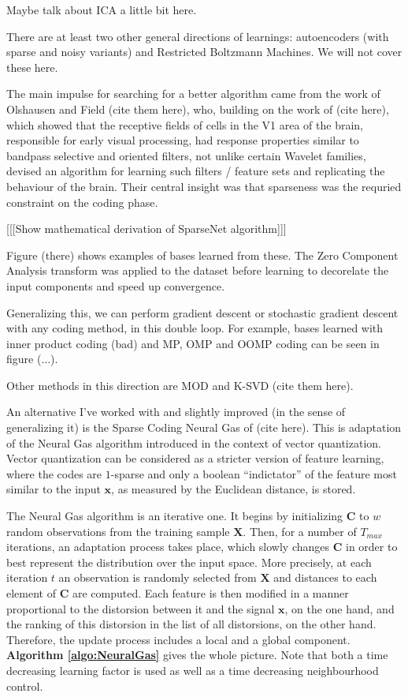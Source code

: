 \documentclass[12pt,a4paper,oneside,english]{UPBThesis}
\begin{document}
Maybe talk about ICA a little bit here.

There are at least two other general directions of learnings: autoencoders (with sparse and noisy variants) and Restricted Boltzmann Machines. We will not cover these here.

The main impulse for searching for a better algorithm came from the work of Olshausen and Field (cite them here), who, building on the work of (cite here), which showed that the receptive fields of cells in the V1 area of the brain, responsible for early visual processing, had response properties similar to bandpass selective and oriented filters, not unlike certain Wavelet families, devised an algorithm for learning such filters / feature sets and replicating the behaviour of the brain. Their central insight was that sparseness was the requried constraint on the coding phase.

[[[Show mathematical derivation of SparseNet algorithm]]]

Figure (there) shows examples of bases learned from these. The Zero Component Analysis transform was applied to the dataset before learning to decorelate the input components and speed up convergence.

Generalizing this, we can perform gradient descent or stochastic gradient descent with any coding method, in this double loop. For example, bases learned with inner product coding (bad) and MP, OMP and OOMP coding can be seen in figure (...).

Other methods in this direction are MOD and K-SVD (cite them here).

An alternative I've worked with and slightly improved (in the sense of generalizing it) is the Sparse Coding Neural Gas of (cite here). This is adaptation of the Neural Gas algorithm introduced in the context of vector quantization. Vector quantization can be considered as a stricter version of feature learning, where the codes are $1$-sparse and only a boolean ``indictator'' of the feature most similar to the input $\textbf{x}$, as measured by the Euclidean distance, is stored.

The Neural Gas algorithm is an iterative one. It begins by initializing $\textbf{C}$ to $w$ random observations from the training sample $\textbf{X}$. Then, for a number of $T_{max}$ iterations, an adaptation process takes place, which slowly changes $\textbf{C}$ in order to best represent the distribution over the input space. More precisely, at each iteration $t$ an observation is randomly selected from $\textbf{X}$ and distances to each element of $\textbf{C}$ are computed. Each feature is then modified in a manner proportional to the distorsion between it and the signal $\textbf{x}$, on the one hand, and the ranking of this distorsion in the list of all distorsions, on the other hand. Therefore, the update process includes a local and a global component. \textbf{Algorithm \ref{algo:NeuralGas}} gives the whole picture. Note that both a time decreasing learning factor is used as well as a time decreasing neighbourhood control. 
\end{document}
